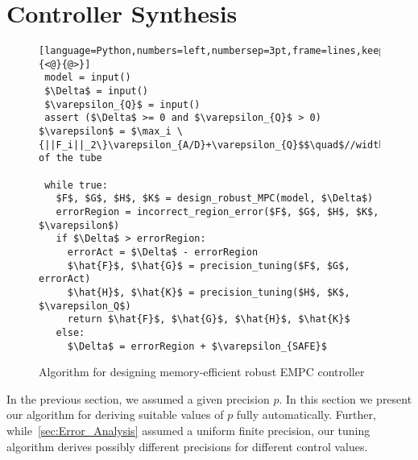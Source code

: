 \section{Controller Synthesis}\label{sec:Controller_Synthesis}

\begin{figure}
\begin{lstlisting}[language=Python,numbers=left,numbersep=3pt,frame=lines,keepspaces=true,mathescape=true,basicstyle=\small\ttfamily,escapeinside={<@}{@>}]
 model = input() 
 $\Delta$ = input()
 $\varepsilon_{Q}$ = input()
 assert ($\Delta$ >= 0 and $\varepsilon_{Q}$ > 0)
$\varepsilon$ = $\max_i \{||F_i||_2\}\varepsilon_{A/D}+\varepsilon_{Q}$$\quad$//width of the tube

 while true:
   $F$, $G$, $H$, $K$ = design_robust_MPC(model, $\Delta$)
   errorRegion = incorrect_region_error($F$, $G$, $H$, $K$, $\varepsilon$)
   if $\Delta$ > errorRegion:
     errorAct = $\Delta$ - errorRegion
     $\hat{F}$, $\hat{G}$ = precision_tuning($F$, $G$, errorAct)
     $\hat{H}$, $\hat{K}$ = precision_tuning($H$, $K$, $\varepsilon_Q$)
     return $\hat{F}$, $\hat{G}$, $\hat{H}$, $\hat{K}$
   else:
     $\Delta$ = errorRegion + $\varepsilon_{SAFE}$
\end{lstlisting}
\caption{Algorithm for designing memory-efficient robust EMPC controller}
\label{lst:alg}
\end{figure}



In the previous section, we assumed a given precision $p$. In this section we
present our algorithm for deriving suitable values of $p$ fully automatically.
Further, while~\autoref{sec:Error_Analysis} assumed a uniform finite precision,
our tuning algorithm derives possibly different precisions for different control
values.

